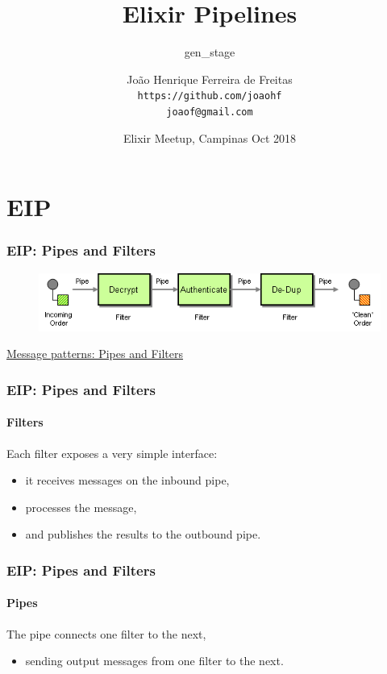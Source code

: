 \documentclass{beamer}
\title{Elixir Pipelines}
\subtitle{gen\_stage}
\author[joaohf]{João Henrique Ferreira de Freitas \\ \texttt{https://github.com/joaohf} \\ \texttt{joaof@gmail.com}}
\date[EMC Oct 2018]{Elixir Meetup, Campinas Oct 2018}
\begin{document}
  \begin{frame}
    \titlepage
  \end{frame}

  \section[Section]{EIP}

  \begin{frame}
    \frametitle{EIP: Pipes and Filters}

     \begin{figure}[t]
     \includegraphics[scale=0.5]{img/PipesAndFilters.png}
     \centering
     \end{figure}
     
     \href{https://www.enterpriseintegrationpatterns.com/patterns/messaging/PipesAndFilters.html}{Message patterns: Pipes and Filters}

  \end{frame}
    
  \begin{frame}
    \frametitle{EIP: Pipes and Filters}
    \framesubtitle{Filters}
    
    Each filter exposes a very simple interface: \pause
    
    \begin{itemize}[<+->]
      \item it receives messages on the inbound pipe,
      \item processes the message,
      \item and publishes the results to the outbound pipe.    
    \end{itemize}
    

  \end{frame}
  
  \begin{frame}
    \frametitle{EIP: Pipes and Filters}
    \framesubtitle{Pipes}

    The pipe connects one filter to the next, \pause

    \begin{itemize}[<+->]
      \item  sending output messages from one filter to the next.
    \end{itemize}
       
  \end{frame}
  
\end{document}
